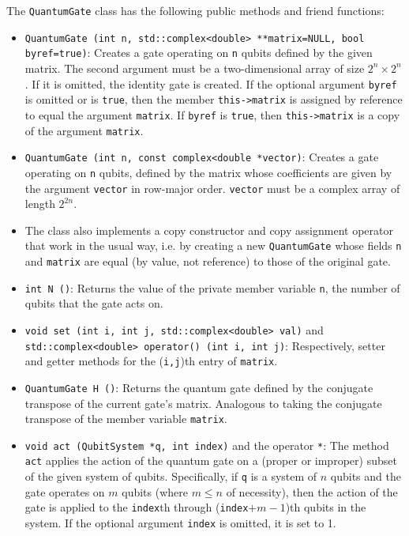 \documentclass{article}
\begin{document}
The \verb~QuantumGate~ class has the following public methods and friend functions: 
\begin{itemize}
\item \verb~QuantumGate (int n, std::complex<double> **matrix=NULL, bool byref=true)~: Creates a gate operating on \verb~n~ qubits defined by the given matrix. The second argument must be a two-dimensional array of size $2^n \times 2^n$. If it is omitted, the identity gate is created. If the optional argument \verb~byref~ is omitted or is \verb~true~, then the member \verb~this->matrix~ is assigned by reference to equal the argument \verb~matrix~. If \verb~byref~ is \verb~true~, then \verb~this->matrix~ is a copy of the argument \verb~matrix~. 

\item \verb~QuantumGate (int n, const complex<double *vector)~: Creates a gate operating on \verb~n~ qubits, defined by the matrix whose coefficients are given by the argument \verb~vector~ in row-major order. \verb~vector~ must be a complex array of length $2^{2n}$.

\item The class also implements a copy constructor and copy assignment operator that work in the usual way, i.e. by creating a new \verb~QuantumGate~ whose fields \verb~n~ and \verb~matrix~ are equal (by value, not reference) to those of the original gate. 

\item \verb~int N ()~: Returns the value of the private member variable \verb~n~, the number of qubits that the gate acts on.

\item \verb~void set (int i, int j, std::complex<double> val)~ and \\
\verb~std::complex<double> operator() (int i, int j)~: Respectively, setter and getter methods for the (\verb~i,j~)th entry of \verb~matrix~. 

\item \verb~QuantumGate H ()~: Returns the quantum gate defined by the conjugate transpose of the current gate's matrix. Analogous to taking the conjugate transpose of the member variable \verb~matrix~. 

\item \verb~void act (QubitSystem *q, int index)~ and the operator \verb~*~: The method \verb~act~ applies the action of the quantum gate on a (proper or improper) subset of the given system of qubits. Specifically, if \verb~q~ is a system of $n$ qubits and the gate operates on $m$ qubits (where $m \le n$ of necessity), then the action of the gate is applied to the \verb~index~th through (\verb~index~$ + m - 1$)th qubits in the system. If the optional argument \verb~index~ is omitted, it is set to 1.


\end{itemize}
\end{document}
